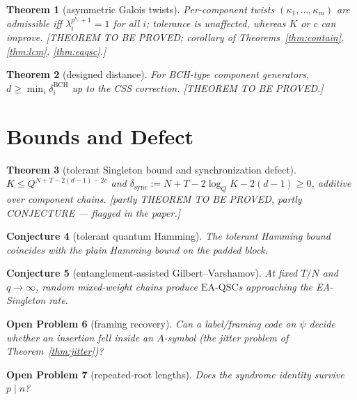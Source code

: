 \documentclass[11pt]{article}
\newtheorem{theorem}{Theorem}[section]
\theoremstyle{definition}
\theoremstyle{remark}
\theoremstyle{plain}
\newtheorem{conjecture}[theorem]{Conjecture}
\newtheorem{openproblem}[theorem]{Open Problem}
\newcommand{\Aalg}{A}
\newcommand{\EAQSC}{\mathrm{EA\text{-}QSC}}
\newcommand{\Tol}{T}
\begin{document}
\begin{theorem}[asymmetric Galois twists]\label{thm:asym}
Per-component twists $(\kappa_1,\dots,\kappa_m)$ are admissible iff
$\lambda_i^{p^{\kappa_i}+1}=1$ for all $i$; tolerance is unaffected, whereas $K$ or $c$ can
improve. \textnormal{[THEOREM TO BE PROVED; corollary of Theorems~\ref{thm:contain},
\ref{thm:lcm}, \ref{thm:eaqsc}.]}
\end{theorem}

\begin{theorem}[designed distance]\label{thm:bch}
For BCH-type component generators, $d\ge\min_i\delta_i^{\mathrm{BCH}}$ up to the CSS
correction. \textnormal{[THEOREM TO BE PROVED.]}
\end{theorem}

\section{Bounds and Defect}\label{sec:bounds}

\begin{theorem}[tolerant Singleton bound and synchronization defect]\label{thm:singleton}
$K\le Q^{N+\Tol-2(d-1)-2c}$ and
$\delta_{\mathrm{sync}}:=N+\Tol-2\log_QK-2(d-1)\ge0$, additive over component chains.
\textnormal{[partly THEOREM TO BE PROVED, partly CONJECTURE --- flagged in the paper.]}
\end{theorem}

\begin{conjecture}[tolerant quantum Hamming]
The tolerant Hamming bound coincides with the plain Hamming bound on the padded block.
\end{conjecture}

\begin{conjecture}[entanglement-assisted Gilbert--Varshamov]
At fixed $\Tol/N$ and $q\to\infty$, random mixed-weight chains produce $\EAQSC$s approaching
the EA-Singleton rate.
\end{conjecture}

\begin{openproblem}[framing recovery]
Can a label/framing code on $\psi$ decide whether an insertion fell \emph{inside} an
$\Aalg$-symbol (the jitter problem of Theorem~\ref{thm:jitter})?
\end{openproblem}

\begin{openproblem}[repeated-root lengths]
Does the syndrome identity survive $p\mid n$?
\end{openproblem}
\end{document}
